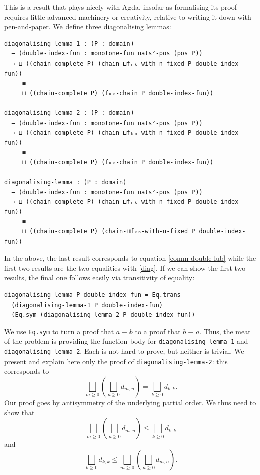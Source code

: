 \documentclass[12pt,a4paper,twoside,openright]{report}
\begin{document}
This is a result that plays nicely with Agda, insofar as formalising its proof requires little advanced machinery or creativity, relative to writing it down with pen-and-paper. We define three diagonalising lemmas:
\begin{verbatim}
diagonalising-lemma-1 : (P : domain) 
  → (double-index-fun : monotone-fun nats²-pos (pos P))
  → ⊔ ((chain-complete P) (chain-⊔fₙₖ-with-n-fixed P double-index-fun)) 
     ≡ 
     ⊔ ((chain-complete P) (fₖₖ-chain P double-index-fun))

diagonalising-lemma-2 : (P : domain) 
  → (double-index-fun : monotone-fun nats²-pos (pos P))
  → ⊔ ((chain-complete P) (chain-⊔fₖₙ-with-n-fixed P double-index-fun)) 
     ≡ 
     ⊔ ((chain-complete P) (fₖₖ-chain P double-index-fun))

diagonalising-lemma : (P : domain) 
  → (double-index-fun : monotone-fun nats²-pos (pos P))
  → ⊔ ((chain-complete P) (chain-⊔fₙₖ-with-n-fixed P double-index-fun)) 
     ≡ 
     ⊔ ((chain-complete P) (chain-⊔fₖₙ-with-n-fixed P double-index-fun))
\end{verbatim}
In the above, the last result corresponds to equation \ref{comm-double-lub} while the first two results are the two equalities with \ref{diag}. If we can show the first two results, the final one follows easily via transitivity of equality:
\begin{verbatim}
diagonalising-lemma P double-index-fun = Eq.trans 
  (diagonalising-lemma-1 P double-index-fun) 
  (Eq.sym (diagonalising-lemma-2 P double-index-fun))
\end{verbatim}
We use \texttt{Eq.sym} to turn a proof that $a\equiv b$ to a proof that $b \equiv a$. Thus, the meat of the problem is providing the function body for \texttt{diagonalising-lemma-1} and \texttt{diagonalising-lemma-2}. Each is not hard to prove, but neither is trivial. We present and explain here only the proof of \texttt{diagonalising-lemma-2}: this corresponds to
\[
\bigsqcup_{m\geq 0} \left( \bigsqcup_{n\geq 0} d_{m,n} \right) = \bigsqcup_{k \geq 0} d_{k, k}.
\]
Our proof goes by antisymmetry of the underlying partial order. We thus need to show that
\begin{equation} \label{anti-sym1}
\bigsqcup_{m \geq 0} \left( \bigsqcup_{n\geq 0} d_{m,n} \right) \leq \bigsqcup_{k \geq 0} d_{k, k}
\end{equation}
and
\begin{equation} \label{anti-sym2}
\bigsqcup_{k \geq 0} d_{k, k} \leq \bigsqcup_{m \geq 0} \left( \bigsqcup_{n\geq 0} d_{m,n} \right) .
\end{equation}
\end{document}
